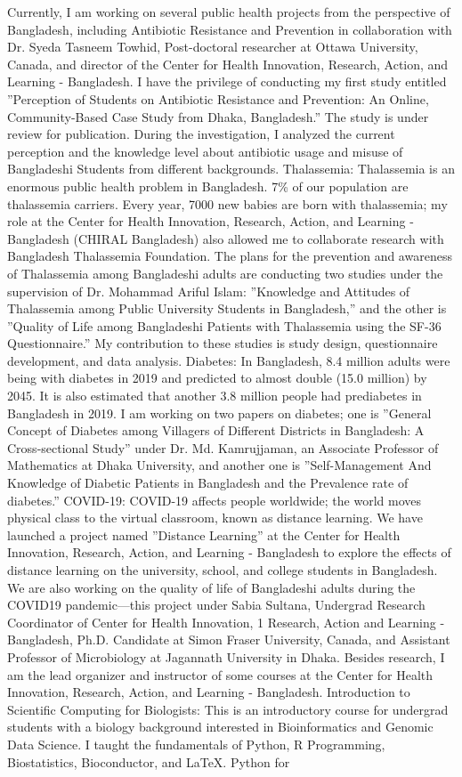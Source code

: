 \documentclass{article}
\begin{document}
Currently, I am working on several public health projects from the perspective of Bangladesh, including Antibiotic Resistance and Prevention in collaboration with Dr. Syeda Tasneem Towhid, Post-doctoral researcher at Ottawa University, Canada, and director of the Center for Health Innovation, Research, Action, and Learning - Bangladesh. I have the privilege of conducting my first study entitled ”Perception of Students on Antibiotic Resistance and Prevention: An Online, Community-Based Case Study from Dhaka, Bangladesh.” The study is under review for publication. During the investigation, I analyzed the current perception and the knowledge level about antibiotic usage and misuse of Bangladeshi Students from different backgrounds. Thalassemia: Thalassemia is an enormous public health problem in Bangladesh. 7\% of our population are thalassemia carriers. Every year, 7000 new babies are born with thalassemia; my role at the Center for Health Innovation, Research, Action, and Learning -Bangladesh (CHIRAL Bangladesh) also allowed me to collaborate research with Bangladesh Thalassemia Foundation. The plans for the prevention and awareness of Thalassemia among Bangladeshi adults are conducting two studies under the supervision of Dr. Mohammad Ariful Islam: ”Knowledge and Attitudes of Thalassemia among Public University Students in Bangladesh,” and the other is ”Quality of Life among Bangladeshi Patients with Thalassemia using the SF-36 Questionnaire.” My contribution to these studies is study design, questionnaire development, and data analysis. Diabetes: In Bangladesh, 8.4 million adults were being with diabetes in 2019 and predicted to almost double (15.0 million) by 2045. It is also estimated that another 3.8 million people had prediabetes in Bangladesh in 2019. I am working on two papers on diabetes; one is ”General Concept of Diabetes among Villagers of Different Districts in Bangladesh: A Cross-sectional Study” under Dr. Md. Kamrujjaman, an Associate Professor of Mathematics at Dhaka University, and another one is ”Self-Management And Knowledge of Diabetic Patients in Bangladesh and the Prevalence rate of diabetes.” COVID-19: COVID-19 affects people worldwide; the world moves physical class to the virtual classroom, known as distance learning. We have launched a project named ”Distance Learning” at the Center for Health Innovation, Research, Action, and Learning - Bangladesh to explore the effects of distance learning on the university, school, and college students in Bangladesh. We are also working on the quality of life of Bangladeshi adults during the COVID19 pandemic—this project under Sabia Sultana, Undergrad Research Coordinator of Center for Health Innovation, 1 Research, Action and Learning - Bangladesh, Ph.D. Candidate at Simon Fraser University, Canada, and Assistant Professor of Microbiology at Jagannath University in Dhaka. Besides research, I am the lead organizer and instructor of some courses at the Center for Health Innovation, Research, Action, and Learning - Bangladesh. Introduction to Scientific Computing for Biologists: This is an introductory course for undergrad students with a biology background interested in Bioinformatics and Genomic Data Science. I taught the fundamentals of Python, R Programming, Biostatistics, Bioconductor, and LaTeX. Python for 
\end{document}
